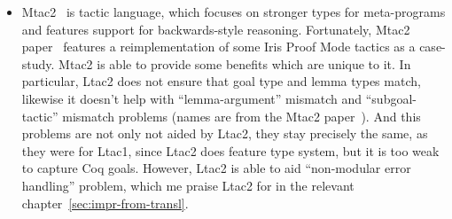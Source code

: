 \begin{itemize}
\item Mtac2~\cite{kaiserMtac2TypedTactics2018a} is tactic language, which focuses on stronger types for meta-programs and features support for backwards-style reasoning.
  Fortunately, Mtac2 paper~\cite{kaiserMtac2TypedTactics2018a} features a reimplementation of some Iris Proof Mode tactics as a case-study.
  Mtac2 is able to provide some benefits which are unique to it.
  In particular, Ltac2 does not ensure that goal type and lemma types match, likewise it doesn't help with ``lemma-argument'' mismatch and ``subgoal-tactic'' mismatch problems (names are from the Mtac2 paper~\cite[Section~5.4]{kaiserMtac2TypedTactics2018a}).
  And this problems are not only not aided by Ltac2, they stay precisely the same, as they were for Ltac1, since Ltac2 does feature type system, but it is too weak to capture Coq goals.
  However, Ltac2 is able to aid ``non-modular error handling'' problem, which me praise Ltac2 for in the relevant chapter~\ref{sec:impr-from-transl}.


\end{itemize}
